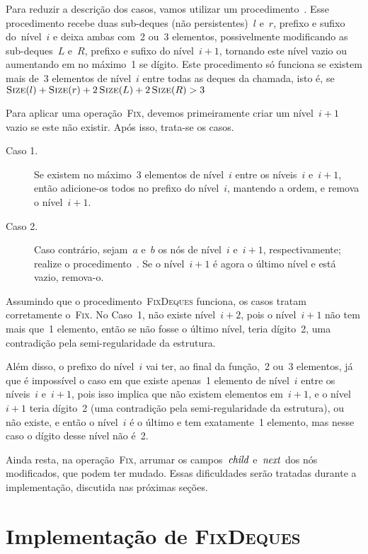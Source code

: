 \documentclass[main.tex]{subfiles}
\begin{document}
Para reduzir a descrição dos casos, vamos utilizar um procedimento~. Esse procedimento recebe duas sub-deques (não persistentes)~$l$ e~$r$, prefixo e sufixo do~nível~$i$ e deixa ambas com~2 ou~3 elementos, possivelmente modificando as sub-deques~$L$ e~$R$, prefixo e sufixo do nível~$i+1$, tornando este nível vazio ou aumentando em no máximo~1 se dígito. Este procedimento só funciona se existem mais de~3 elementos de nível~$i$ entre todas as deques da chamada, isto é, se~${\Call{Size}{l} + \Call{Size}{r} + 2\,\Call{Size}{L} + 2\,\Call{Size}{R} > 3}$

Para aplicar uma operação~\textsc{Fix}, devemos primeiramente criar um nível~$i+1$ vazio se este não existir. Após isso, trata-se os casos.

\begin{description}
    \item[Caso 1.] Se existem no máximo~3 elementos de nível~$i$ entre os níveis~$i$ e~$i+1$, então adicione-os todos no prefixo do nível~$i$, mantendo a ordem, e remova o nível~$i+1$.
    \item[Caso 2.] Caso contrário, sejam~$a$ e~$b$ os nós de nível~$i$ e~$i+1$, respectivamente; realize o procedimento~. Se o nível~$i+1$ é agora o último nível e está vazio, remova-o.
\end{description}

Assumindo que o procedimento~\textsc{FixDeques} funciona, os casos tratam corretamente o~\textsc{Fix}. No Caso~1, não existe nível~$i+2$, pois o nível~$i+1$ não tem mais que~1 elemento, então se não fosse o último nível, teria dígito~2, uma contradição pela semi-regularidade da estrutura.

Além disso, o prefixo do nível~$i$ vai ter, ao final da função,~2 ou~3 elementos, já que é impossível o caso em que existe apenas~1 elemento de nível~$i$ entre os níveis~$i$ e~$i+1$, pois isso implica que não existem elementos em~$i+1$, e o nível~$i+1$ teria dígito~2 (uma contradição pela semi-regularidade da estrutura), ou não existe, e então o nível~$i$ é o último e tem exatamente~1 elemento, mas nesse caso o dígito desse nível não é~2.

Ainda resta, na operação~\textsc{Fix}, arrumar os campos~$\mathit{child}$ e~$\mathit{next}$ dos nós modificados, que podem ter mudado. Essas dificuldades serão tratadas durante a implementação, discutida nas próximas seções.

\section{Implementação de {\normalfont \textsc{FixDeques}}} \label{sec:fix_deques}
\end{document}
